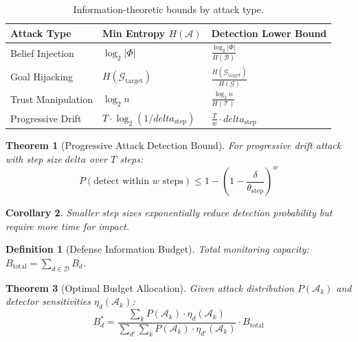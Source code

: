 \documentclass[
]{article}
\newtheorem{definition}{Definition}[section]
\newtheorem{theorem}{Theorem}[section]
\newtheorem{corollary}[theorem]{Corollary}
\begin{document}
\begin{table}[htbp]
\centering
\caption{Information-theoretic bounds by attack type.}
\label{tab:attack-bounds}
\begin{tabular}{@{}lll@{}}
\toprule
Attack Type & Min Entropy $H(\mathcal{A})$ & Detection Lower Bound \\
\midrule
Belief Injection & $\log_2 |\Phi|$ & $\frac{\log_2 |\Phi|}{H(\mathcal{B})}$ \\
Goal Hijacking & $H(\mathcal{G}_{\text{target}})$ & $\frac{H(\mathcal{G}_{\text{target}})}{H(\mathcal{G})}$ \\
Trust Manipulation & $\log_2 n$ & $\frac{\log_2 n}{H(\mathcal{T})}$ \\
Progressive Drift & $T \cdot \log_2(1/delta_{\text{step}})$ & $\frac{T}{w} \cdot delta_{\text{step}}$ \\
\bottomrule
\end{tabular}
\end{table}

\begin{theorem}[Progressive Attack Detection Bound]
\label{thm:progressive-detection}
For progressive drift attack with step size $delta$ over $T$ steps:
\begin{equation}
\label{eq:progressive-bound}
P(\text{detect within } w \text{ steps}) \leq 1 - \left(1 - \frac{\delta}{\theta_{\text{step}}}\right)^{w}
\end{equation}
\end{theorem}

\begin{corollary}
\label{cor:small-steps}
Smaller step sizes exponentially reduce detection probability but require more time for impact.
\end{corollary}

\begin{definition}[Defense Information Budget]
\label{def:defense-budget}
Total monitoring capacity: $B_{\text{total}} = \sum_{d \in \mathcal{D}} B_d$.
\end{definition}

\begin{theorem}[Optimal Budget Allocation]
\label{thm:optimal-allocation}
Given attack distribution $P(\mathcal{A}_k)$ and detector sensitivities $\eta_d(\mathcal{A}_k)$:
\begin{equation}
\label{eq:optimal-allocation}
B_d^* = \frac{\sum_k P(\mathcal{A}_k) \cdot \eta_d(\mathcal{A}_k)}{\sum_{d'}\sum_k P(\mathcal{A}_k) \cdot \eta_{d'}(\mathcal{A}_k)} \cdot B_{\text{total}}
\end{equation}
\end{theorem}
\end{document}
